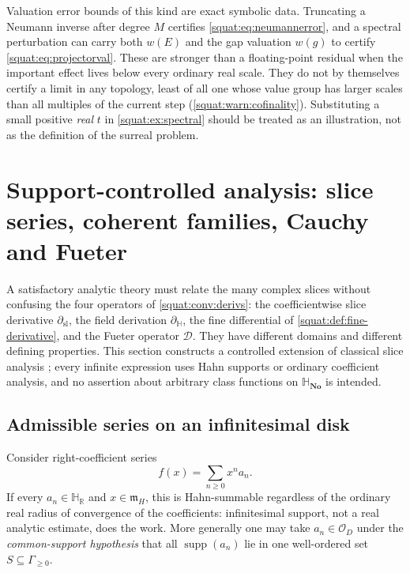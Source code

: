 \documentclass[11pt,letterpaper]{article}
\numberwithin{equation}{section}
\theoremstyle{definition}
\theoremstyle{remark}
\newcommand{\No}{\mathbf{No}}
\newcommand{\SQ}{\mathbb H_{\No}}
\newcommand{\HR}{\mathbb H_{\mathbb R}}
\newcommand{\OO}{\mathcal O}
\newcommand{\mm}{\mathfrak m}
\newcommand{\supp}{\operatorname{supp}}
\newcommand{\DD}{\mathcal D}
\newcommand{\dsl}{\partial_{\mathrm{sl}}}
\newcommand{\dH}{\partial_{\mathbb H}}
\begin{document}
Valuation error bounds of this kind are exact symbolic data. Truncating a Neumann inverse
after degree $M$ certifies \cref{squat:eq:neumannerror}, and a spectral perturbation can
carry both $w(E)$ and the gap valuation $w(g)$ to certify
\cref{squat:eq:projectorval}. These are stronger than a floating-point residual when the
important effect lives below every ordinary real scale. They do not by themselves certify a
limit in any topology, least of all one whose value group has larger scales than all
multiples of the current step (\cref{squat:warn:cofinality}). Substituting a small positive
\emph{real} $t$ in \cref{squat:ex:spectral} should be treated as an illustration, not as
the definition of the surreal problem.

\section{Support-controlled analysis: slice series, coherent families, Cauchy and Fueter}
\label{squat:sec:analysis}

A satisfactory analytic theory must relate the many complex slices without confusing the
four operators of \cref{squat:conv:derivs}: the coefficientwise slice derivative $\dsl$,
the field derivation $\dH$, the fine differential of
\cref{squat:def:fine-derivative}, and the Fueter operator $\DD$. They have different
domains and different defining properties. This section constructs a controlled extension
of classical slice analysis \cite{GP}; every infinite expression uses Hahn supports or
ordinary coefficient analysis, and no assertion about arbitrary class functions on $\SQ$ is
intended.

\subsection{Admissible series on an infinitesimal disk}\label{squat:sub:formalseries}
Consider right-coefficient series
\begin{equation}\label{squat:eq:formalseries}
 f(x)=\sum_{n\ge0}x^na_n .
\end{equation}
If every $a_n\in\HR$ and $x\in\mm_H$, this is Hahn-summable regardless of the ordinary
real radius of convergence of the coefficients: infinitesimal support, not a real analytic
estimate, does the work. More generally one may take $a_n\in\OO_D$ under the
\emph{common-support hypothesis} that all $\supp(a_n)$ lie in one well-ordered set
$S\subseteq\Gamma_{\ge0}$.
\end{document}
